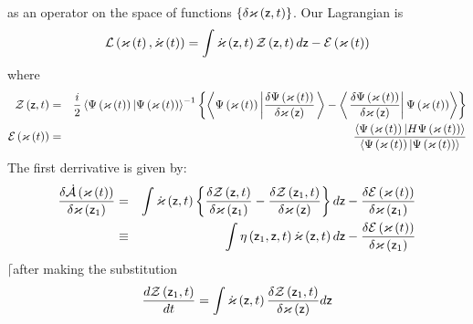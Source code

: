 as an operator on the space of functions $\left\{ \delta \varkappa \left( 
{\sf z},t\right) \right\} $. Our Lagrangian is 
\begin{equation}
{\cal L}\left( {\cal \varkappa }\left( t\right) ,{\cal \dot{\varkappa}}%
\left( t\right) \right) =\int {\cal \dot{\varkappa}}\left( {\sf z},t\right) 
{\cal Z}\left( {\sf z},t\right) d{\sf z}-{\cal E}\left( {\cal \varkappa }%
\left( t\right) \right) 
\end{equation}%
where 
\begin{eqnarray}
{\cal Z}\left( {\sf z},t\right)  &=&\frac{i}{2}\left\langle \Psi \left( 
{\cal \varkappa }\left( t\right) \right) |\Psi \left( {\cal \varkappa }%
\left( t\right) \right) \right\rangle ^{-1}\left\{ \left\langle \Psi \left( 
{\cal \varkappa }\left( t\right) \right) \left| \frac{\delta \Psi \left( 
{\cal \varkappa }\left( t\right) \right) }{\delta {\cal \varkappa }\left( 
{\sf z}\right) }\right. \right\rangle -\left\langle \left. \frac{\delta \Psi
\left( {\cal \varkappa }\left( t\right) \right) }{\delta {\cal \varkappa }%
\left( {\sf z}\right) }\right| \Psi \left( {\cal \varkappa }\left( t\right)
\right) \right\rangle \right\}  \\
{\cal E}\left( {\cal \varkappa }\left( t\right) \right)  &=&\frac{%
\left\langle \Psi \left( {\cal \varkappa }\left( t\right) \right) |H\Psi
\left( {\cal \varkappa }\left( t\right) \right) \right\rangle }{\left\langle
\Psi \left( {\cal \varkappa }\left( t\right) \right) |\Psi \left( {\cal %
\varkappa }\left( t\right) \right) \right\rangle }
\end{eqnarray}%
The first derrivative is given by: 
\begin{eqnarray}
\frac{\delta {\cal \dot{A}}\left( \varkappa \left( t\right) \right) }{\delta
\varkappa \left( {\sf z}_{1}\right) } &=&\int {\cal \dot{\varkappa}}\left( 
{\sf z},t\right) \left\{ \frac{\delta {\cal Z}\left( {\sf z},t\right) }{%
\delta \varkappa \left( {\sf z}_{1}\right) }-\frac{\delta {\cal Z}\left( 
{\sf z}_{1},t\right) }{\delta {\cal \varkappa }\left( {\sf z}\right) }%
\right\} d{\sf z}-\frac{\delta {\cal E}\left( {\cal \varkappa }\left(
t\right) \right) }{\delta \varkappa \left( {\sf z}_{1}\right) } \\
&\equiv &\int \eta \left( {\sf z}_{1},{\sf z},t\right) {\cal \dot{\varkappa}}%
\left( {\sf z},t\right) d{\sf z}-\frac{\delta {\cal E}\left( {\cal \varkappa 
}\left( t\right) \right) }{\delta \varkappa \left( {\sf z}_{1}\right) }
\end{eqnarray}%
$\lceil $after making the substitution 
\begin{equation}
\frac{d{\cal Z}\left( {\sf z}_{1},t\right) }{dt}=\int {\cal \dot{\varkappa}}%
\left( {\sf z},t\right) \frac{\delta {\cal Z}\left( {\sf z}_{1},t\right) }{%
\delta {\cal \varkappa }\left( {\sf z}\right) }d{\sf z}
\end{equation}%
